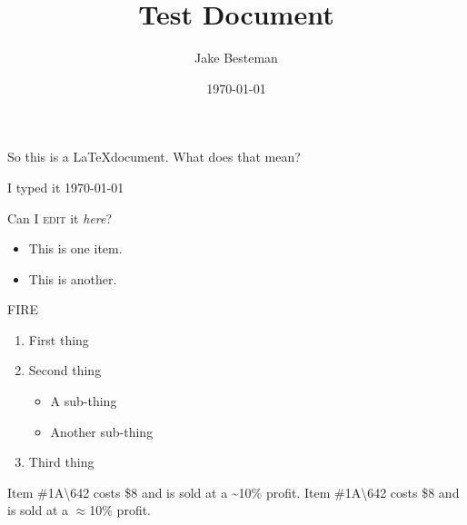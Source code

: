 \documentclass{article}
\begin{document}
\title{Test Document}
\author{Jake Besteman}
\date{\today}
\maketitle

\tableofcontents
\newpage
{}

So this is a \LaTeX document. What does that mean?

I typed it \today

Can I \textsc{edit} it \textit{here}?

\begin{itemize}
\item This is one item.
\item This is another.
\end{itemize}
{\color{red}FIRE}


\begin{enumerate}
\item First thing
\item Second thing
\begin{itemize}
\item A sub-thing
\item Another sub-thing
\end{itemize}
\item Third thing
\end{enumerate}

Item \#1A\textbackslash642 costs \$8 and is sold at a \~{}10\% profit.
Item \#1A\textbackslash642 costs \$8 and is sold at a $\approx$10\% profit.
\end{document}
